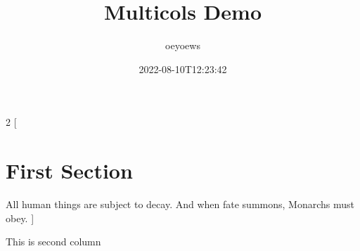 \documentclass{article}
\title{Multicols Demo}
\author{oeyoews}
\date{2022-08-10T12:23:42}
\begin{document}
\maketitle

\begin{multicols}{2}
[
\section{First Section}
All human things are subject to decay. And when fate summons, Monarchs must obey.
]
\blindtext\blindtext

This is second column
\end{multicols}
\end{document}
